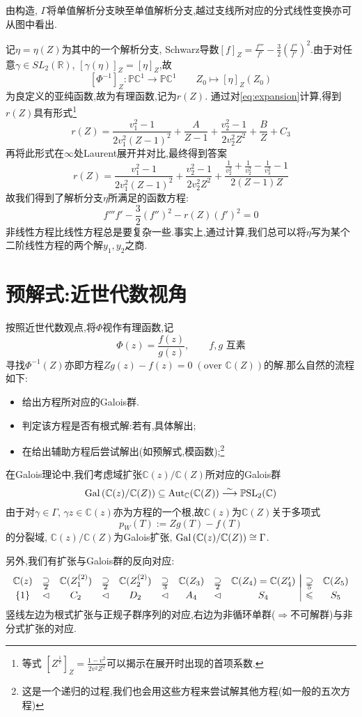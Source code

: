 由构造, $\Gamma$将单值解析分支映至单值解析分支,越过支线所对应的分式线性变换亦可从图中看出.

记$\eta=\eta(Z)$为其中的一个解析分支, Schwarz导数$[f]_Z=\frac{f'''}{f'}-\frac{3}{2}\left(\frac{f''}{f'}\right)^2$.由于对任意$\gamma \in SL_2(\mathbb{R})$, $[\gamma(\eta)]_Z=[\eta]_Z$,故
$$[\varPhi^{-1}]_Z:\mathbb{PC}^1 \longrightarrow \mathbb{PC}^1 \qquad Z_0 \longmapsto [\eta]_Z(Z_0)$$
为良定义的亚纯函数,故为有理函数,记为$r(Z)$.
通过对\eqref{eq:expansion}计算,得到$r(Z)$具有形式\footnote{等式 $\displaystyle[Z^{\frac{1}{v}}]_Z=\frac{1-v^2}{2v^2Z^2}$可以揭示在展开时出现的首项系数.}
$$r(Z)=\frac{v_{1}^{2}-1}{2 v_{1}^{2}(Z-1)^{2}}+\frac{A}{Z-1}+\frac{v_{2}^{2}-1}{2 v_{2}^{2} Z^{2}}+\frac{B}{Z}+C_{3}$$
再将此形式在$\infty$处Laurent展开并对比,最终得到答案
$$r(Z)=\frac{v_{1}^{2}-1}{2 v_{1}^{2}(Z-1)^{2}}+\frac{v_{2}^{2}-1}{2 v_{2}^{2}Z^2} +\frac{\frac{1}{v_{2}^{2}}+\frac{1}{v_{2}^2}-\frac{1}{v_{3}^{2}}-1}{2(Z-1) Z}$$
故我们得到了解析分支$\eta$所满足的函数方程:
$$f'''f'-\frac{3}{2} (f'')^2-r(Z)(f')^2=0$$
非线性方程比线性方程总是要复杂一些.事实上,通过计算,我们总可以将$\eta$写为某个二阶线性方程的两个解$y_1,y_2$之商.
\section{预解式:近世代数视角}\label{sec:inverse-alge}

按照近世代数观点,将$\varPhi$视作有理函数,记
$$\varPhi(z)=\frac{f(z)}{g(z)}, \qquad f,g \text{ 互素}$$
寻找$\varPhi^{-1}(Z)$亦即方程$Zg(z)-f(z)=0 \;(\text{over }\mathbb{C}(Z))$的解.那么自然的流程如下:
\begin{itemize}
	\item 给出方程所对应的Galois群.
	\item 判定该方程是否有根式解:若有,具体解出;
	\item 在给出辅助方程后尝试解出(如预解式,模函数);\footnote{这是一个递归的过程,我们也会用这些方程来尝试解其他方程(如一般的五次方程)}
\end{itemize}
在Galois理论中,我们考虑域扩张$\mathbb{C}(z)/\mathbb{C}(Z)$所对应的Galois群
$$\operatorname{Gal} \left(\mathbb{C}(z)/\mathbb{C}(Z)\right) \subseteq \operatorname{Aut}_{\mathbb{C}}(\mathbb{C}(Z)) \overset{\sim}{\longrightarrow} \operatorname{\mathbb{P}SL}_2(\mathbb{C})$$
由于对$\gamma \in \Gamma$, $\gamma z \in \mathbb{C}(z)$亦为方程的一个根,故$\mathbb{C}(z)$为$\mathbb{C}(Z)$关于多项式
$$p_W(T):= Zg(T)-f(T)$$
的分裂域, $\mathbb{C}(z)/\mathbb{C}(Z)$为Galois扩张, $\operatorname{Gal}\left(\mathbb{C}(z)/\mathbb{C}(Z)\right) \cong \Gamma$.

另外,我们有扩张与Galois群的反向对应:
\[	\setcounter{MaxMatrixCols}{15}
\begin{array}{ccccccccc|cc}
\mathbb{C}(z) &\supseteq &\mathbb{C}(Z_1^{(2)}) &\supseteq &\mathbb{C}(Z_2^{(2)}) &\supseteq &\mathbb{C}(Z_3) &\supseteq  &\mathbb{C}(Z_4) =  \mathbb{C}(Z_4') &\supseteq  &\mathbb{C}(Z_5)\\[-0.45cm]
&\underset{2}{}&&\underset{2}{}&&\underset{3}{}&&\underset{2}{}&&\underset{5}{}&\\
\{1\} &\lhd &C_2 &\lhd &D_2  &\lhd &A_4 &\lhd &S_4 &\leqslant &S_5
\end{array}
\]
竖线左边为根式扩张与正规子群序列的对应,右边为非循环单群($\Rightarrow$不可解群)与非分式扩张的对应.

